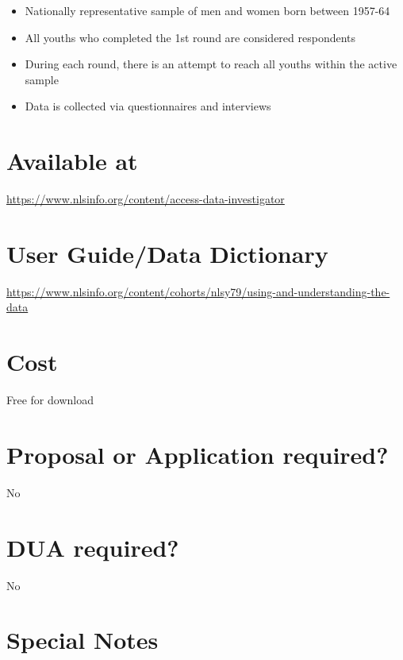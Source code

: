 \documentclass[
]{book}
\providecommand{\tightlist}{%
  \setlength{\itemsep}{0pt}\setlength{\parskip}{0pt}}
\begin{document}
\begin{itemize}
\tightlist
\item
  Nationally representative sample of men and women born between 1957-64
\item
  All youths who completed the 1st round are considered respondents
\item
  During each round, there is an attempt to reach all youths within the active sample
\item
  Data is collected via questionnaires and interviews
\end{itemize}

\hypertarget{available-at-58}{%
\section{Available at}\label{available-at-58}}

\url{https://www.nlsinfo.org/content/access-data-investigator}

\hypertarget{user-guidedata-dictionary-58}{%
\section{User Guide/Data Dictionary}\label{user-guidedata-dictionary-58}}

\url{https://www.nlsinfo.org/content/cohorts/nlsy79/using-and-understanding-the-data}

\hypertarget{cost-58}{%
\section{Cost}\label{cost-58}}

Free for download

\hypertarget{proposal-or-application-required-58}{%
\section{Proposal or Application required?}\label{proposal-or-application-required-58}}

No

\hypertarget{dua-required-58}{%
\section{DUA required?}\label{dua-required-58}}

No

\hypertarget{special-notes-58}{%
\section{Special Notes}\label{special-notes-58}}
\end{document}
